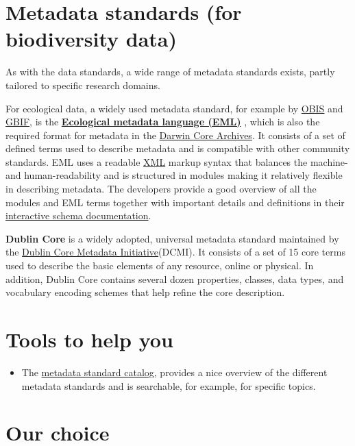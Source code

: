 \documentclass[
  oneside]{book}
\providecommand{\tightlist}{%
  \setlength{\itemsep}{0pt}\setlength{\parskip}{0pt}}
\begin{document}
\section{Metadata standards (for biodiversity data)}\label{metadata-standards-for-biodiversity-data}

As with the data standards, a wide range of metadata standards exists, partly tailored to specific research domains.

For ecological data, a widely used metadata standard, for example by \hyperref[OBIS]{OBIS} and \hyperref[GBIF]{GBIF}, is the \hyperref[eml]{\textbf{Ecological metadata language (EML)}} \autocite{Jones_2019}, which is also the required format for metadata in the \hyperref[DwC-A]{Darwin Core Archives}. It consists of a set of defined terms used to describe metadata and is compatible with other community standards. EML uses a readable \hyperref[XML]{XML} markup syntax that balances the machine- and human-readability and is structured in modules making it relatively flexible in describing metadata. The developers provide a good overview of all the modules and EML terms together with important details and definitions in their \href{https://eml.ecoinformatics.org/schema/}{interactive schema documentation}.

\textbf{Dublin Core} is a widely adopted, universal metadata standard maintained by the \href{https://dublincore.org/}{Dublin Core Metadata Initiative}(DCMI). It consists of a set of 15 core terms used to describe the basic elements of any resource, online or physical. In addition, Dublin Core contains several dozen properties, classes, data types, and vocabulary encoding schemes that help refine the core description.

\section{Tools to help you}\label{tools-to-help-you-4}

\begin{itemize}
\tightlist
\item
  The \href{https://rdamsc.bath.ac.uk/}{metadata standard catalog}, provides a nice overview of the different metadata standards and is searchable, for example, for specific topics.
\end{itemize}

\section{Our choice}\label{our-choice-2}
\end{document}
